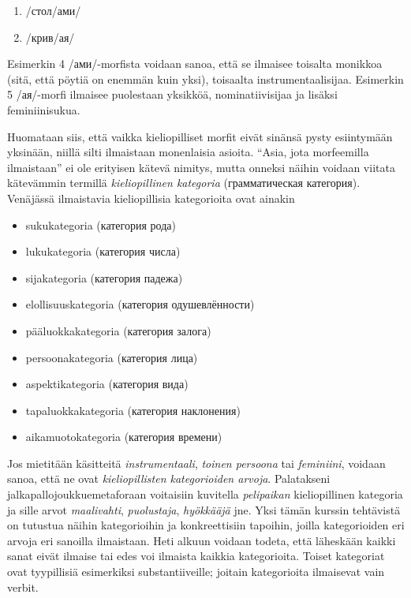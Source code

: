 \documentclass[]{scrreprt}
\providecommand{\tightlist}{%
  \setlength{\itemsep}{0pt}\setlength{\parskip}{0pt}}
\begin{document}
\begin{enumerate}
\def\labelenumi{(\arabic{enumi})}
\setcounter{enumi}{3}
\tightlist
\item
  /стол/ами/
\item
  /крив/ая/
\end{enumerate}

Esimerkin 4 /ами/-morfista voidaan sanoa, että se ilmaisee toisalta
monikkoa (sitä, että pöytiä on enemmän kuin yksi), toisaalta
instrumentaalisijaa. Esimerkin 5 /ая/-morfi ilmaisee puolestaan
yksikköä, nominatiivisijaa ja lisäksi feminiinisukua.

Huomataan siis, että vaikka kieliopilliset morfit eivät sinänsä pysty
esiintymään yksinään, niillä silti ilmaistaan monenlaisia asioita.
``Asia, jota morfeemilla ilmaistaan'' ei ole erityisen kätevä nimitys,
mutta onneksi näihin voidaan viitata kätevämmin termillä
\emph{kieliopillinen kategoria} (грамматическая категория). Venäjässä
ilmaistavia kieliopillisia kategorioita ovat ainakin

\begin{itemize}
\tightlist
\item
  sukukategoria (категория рода)
\item
  lukukategoria (категория числа)
\item
  sijakategoria (категория падежа)
\item
  elollisuuskategoria (категория одушевлённости)
\item
  pääluokkakategoria (категория залога)
\item
  persoonakategoria (категория лица)
\item
  aspektikategoria (категория вида)
\item
  tapaluokkakategoria (категория наклонения)
\item
  aikamuotokategoria (категория времени)
\end{itemize}

Jos mietitään käsitteitä \emph{instrumentaali}, \emph{toinen persoona}
tai \emph{feminiini}, voidaan sanoa, että ne ovat \emph{kieliopillisten
kategorioiden arvoja}. Palatakseni jalkapallojoukkuemetaforaan
voitaisiin kuvitella \emph{pelipaikan} kieliopillinen kategoria ja sille
arvot \emph{maalivahti}, \emph{puolustaja}, \emph{hyökkääjä} jne. Yksi
tämän kurssin tehtävistä on tutustua näihin kategorioihin ja
konkreettisiin tapoihin, joilla kategorioiden eri arvoja eri sanoilla
ilmaistaan. Heti alkuun voidaan todeta, että läheskään kaikki sanat
eivät ilmaise tai edes voi ilmaista kaikkia kategorioita. Toiset
kategoriat ovat tyypillisiä esimerkiksi substantiiveille; joitain
kategorioita ilmaisevat vain verbit.
\end{document}
